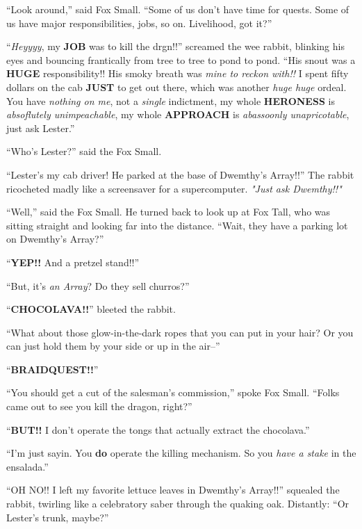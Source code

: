\documentclass[10pt,twoside]{report}
\begin{document}
``Look around,'' said Fox Small.  ``Some of us don't have time for
        quests.  Some of us have major responsibilities, jobs, so on.
        Livelihood, got it?''

``{\em Heyyyy}, my {\bf JOB} was to kill the drgn!!'' screamed the wee
        rabbit, blinking his eyes and bouncing frantically from tree
        to tree to pond to pond.  ``His snout was a {\bf HUGE}
        responsibility!!  His smoky breath was {\em mine to reckon
          with!!} I spent fifty dollars on the cab {\bf JUST} to get
        out there, which was another {\em huge huge} ordeal.  You have
        {\em nothing on me}, not a {\em single} indictment, my whole
        {\bf HERONESS} is {\em absoflutely unimpeachable}, my whole
        {\bf APPROACH} is {\em abassoonly unapricotable}, just ask
        Lester.''

``Who's Lester?'' said the Fox Small.

``Lester's my cab driver!  He parked at the base of Dwemthy's
        Array!!''  The rabbit ricocheted madly like a screensaver for
        a supercomputer.  {\em "Just ask Dwemthy!!"}

``Well,'' said the Fox Small.  He turned back to look up at Fox Tall,
        who was sitting straight and looking far into the distance.
        ``Wait, they have a parking lot on Dwemthy's Array?''

``{\bf YEP!!}  And a pretzel stand!!''

``But, it's {\em an Array}?  Do they sell churros?''

``{\bf CHOCOLAVA!!}'' bleeted the rabbit.

``What about those glow-in-the-dark ropes that you can put in your
        hair?  Or you can just hold them by your side or up in the
        air--''

``{\bf BRAIDQUEST!!}''

``You should get a cut of the salesman's commission,'' spoke Fox
        Small.  ``Folks came out to see you kill the dragon, right?''

``{\bf BUT!!}  I don't operate the tongs that actually extract the
        chocolava.''

``I'm just sayin.  You {\bf do} operate the killing mechanism.  So you
        {\em have a stake} in the ensalada.''

``OH NO!!  I left my favorite lettuce leaves in Dwemthy's Array!!''
        squealed the rabbit, twirling like a celebratory saber through
        the quaking oak.  Distantly: ``Or Lester's trunk, maybe?''
\end{document}
